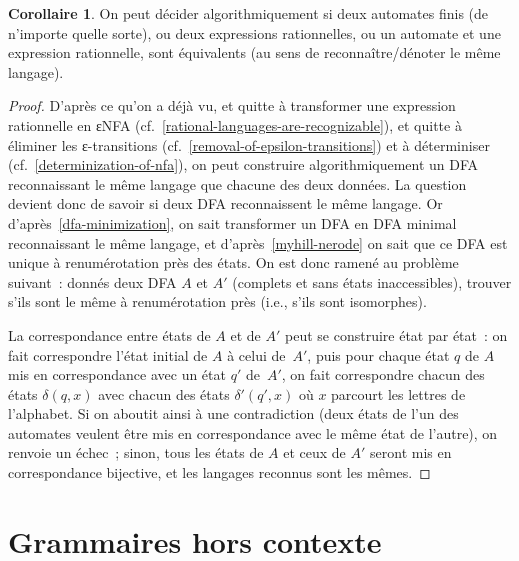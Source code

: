 \documentclass[12pt,a4paper]{article}
\theoremstyle{definition}
\newtheorem{cor}[comcnt]{Corollaire}
\begin{document}
\begin{cor}\label{equivalence-of-regexps-is-decidable}
On peut décider algorithmiquement si deux automates finis (de
n'importe quelle sorte), ou deux expressions rationnelles, ou un
automate et une expression rationnelle, sont équivalents (au sens de
reconnaître/dénoter le même langage).
\end{cor}
\begin{proof}
D'après ce qu'on a déjà vu, et quitte à transformer une expression
rationnelle en εNFA (cf. \ref{rational-languages-are-recognizable}),
et quitte à éliminer les ε-transitions
(cf. \ref{removal-of-epsilon-transitions}) et à déterminiser
(cf. \ref{determinization-of-nfa}), on peut construire
algorithmiquement un DFA reconnaissant le même langage que chacune des
deux données.  La question devient donc de savoir si deux DFA
reconnaissent le même langage.  Or d'après \ref{dfa-minimization}, on
sait transformer un DFA en DFA minimal reconnaissant le même langage,
et d'après \ref{myhill-nerode} on sait que ce DFA est unique à
renumérotation près des états.  On est donc ramené au problème
suivant : donnés deux DFA $A$ et $A'$ (complets et sans états
inaccessibles), trouver s'ils sont le même à renumérotation près
(i.e., s'ils sont isomorphes).

La correspondance entre états de $A$ et de $A'$ peut se construire
état par état : on fait correspondre l'état initial de $A$ à celui
de $A'$, puis pour chaque état $q$ de $A$ mis en correspondance avec
un état $q'$ de $A'$, on fait correspondre chacun des états
$\delta(q,x)$ avec chacun des états $\delta'(q',x)$ où $x$ parcourt
les lettres de l'alphabet.  Si on aboutit ainsi à une contradiction
(deux états de l'un des automates veulent être mis en correspondance
avec le même état de l'autre), on renvoie un échec ; sinon, tous les
états de $A$ et ceux de $A'$ seront mis en correspondance bijective,
et les langages reconnus sont les mêmes.
\end{proof}


\section{Grammaires hors contexte}\label{section-context-free-grammars}

\setcounter{comcnt}{0}
\end{document}
